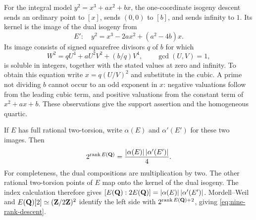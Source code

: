 For the integral model $y^2=x^3+ax^2+bx$, the one-coordinate
isogeny descent sends an ordinary point to $[x]$, sends $(0,0)$ to
$[b]$, and sends infinity to $1$.  Its kernel is the image of the dual
isogeny from
\[
 E':\quad y^2=x^3-2ax^2+(a^2-4b)x.
\]
Its image consists of signed squarefree divisors $q$ of $b$ for which
\begin{equation}\label{eq:nine-isogeny-quartic}
 W^2=qU^4+aU^2V^2+(b/q)V^4,\qquad\gcd(U,V)=1,
\end{equation}
is soluble in integers, together with the stated values at zero and
infinity.  To obtain this equation write $x=q(U/V)^2$ and substitute
in the cubic.  A prime not dividing $b$ cannot occur to an odd exponent
in $x$: negative valuations follow from the leading cubic term, and
positive valuations from the constant term of $x^2+ax+b$.
These observations give the support assertion and the homogeneous
quartic.

If $E$ has full rational two-torsion, write $\alpha(E)$ and
$\alpha'(E')$ for these two images.  Then
\begin{equation}\label{eq:nine-rank-descent}
 2^{\operatorname{rank} E(\mathbf Q)}=\frac{|\alpha(E)|\,|\alpha'(E')|}{4}.
\end{equation}
For completeness, the dual compositions are multiplication by two.
The other rational two-torsion points of $E$ map onto the kernel of
the dual isogeny.  The index calculation therefore gives
$[E(\mathbf Q):2E(\mathbf Q)]=|\alpha(E)|\,|\alpha'(E')|$.
Mordell--Weil and $E(\mathbf Q)[2]\simeq(\mathbf Z/2\mathbf Z)^2$ identify the left side
with $2^{\operatorname{rank} E(\mathbf Q)+2}$, giving
\eqref{eq:nine-rank-descent}.

